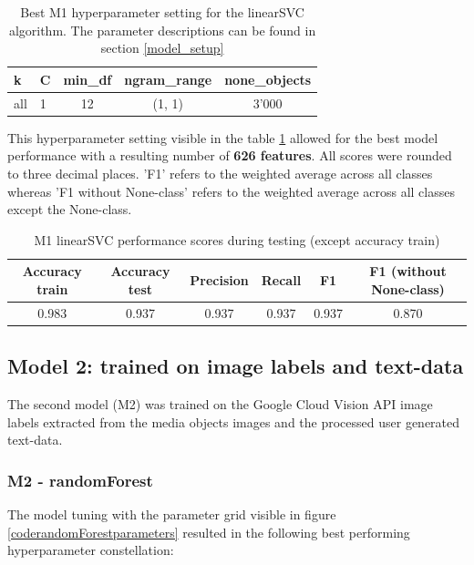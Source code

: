 \begin{table}[h!]
\begin{center}
\caption{Best M1 hyperparameter setting for the linearSVC algorithm. The parameter descriptions can be found in section \ref{model_setup}}\vspace{1ex}
\label{tab:m1_linearSVC_bestParams}
\begin{tabular}{llccc}\hline
k & C & min\_df & ngram\_range & none\_objects \\ \hline
all & 1 & 12 & (1, 1) & 3'000 \\ \hline
\end{tabular}
\end{center}
\end{table}

This hyperparameter setting visible in the table \ref{tab:m1_linearSVC_bestParams} allowed for the best model performance with a resulting number of \textbf{626 features}. All scores were rounded to three decimal places. 'F1' refers to the weighted average across all classes whereas 'F1 without None-class' refers to the weighted average across all classes except the None-class.

\begin{table}[h!]
\begin{center}
\caption{M1 linearSVC performance scores during testing (except accuracy train)}\vspace{1ex}
\label{tab:m1_linearSVC_bestscores}
\begin{tabular}{cccccc}\hline
Accuracy train & Accuracy test & Precision & Recall & F1 & F1 (without None-class)\\ \hline
0.983 & 0.937 & 0.937 & 0.937 & 0.937 & 0.870 \\ \hline
\end{tabular}
\end{center}
\end{table}

\subsection{Model 2: trained on image labels and text-data}
The second model (M2) was trained on the Google Cloud Vision API image labels extracted from the media objects images and the processed user generated text-data.

\subsubsection*{M2 - randomForest}
The model tuning with the parameter grid visible in figure \ref{coderandomForestparameters} resulted in the following best performing hyperparameter constellation:\\

